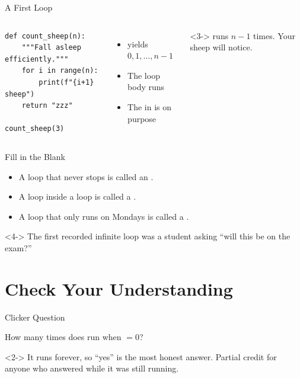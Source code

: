 \documentclass[10pt,aspectratio=169,xcolor=table]{beamer}
\begin{document}
\begin{frame}[fragile]{A First Loop}
  \begin{columns}[T]
      \begin{lstlisting}[style=numbered]
def count_sheep(n):
    """Fall asleep efficiently."""
    for i in range(n):
        print(f"{i+1} sheep")
    return "zzz"

count_sheep(3)
\end{lstlisting}
      \begin{itemize}
        \item<1->  yields $0, 1, \dots, n-1$
        \item<2-> The loop body runs 
        \item<3-> The  in  is
                   on purpose
      \end{itemize}
      \medskip
      \begin{pitfall}<3->
         runs $n-1$ times. Your sheep will notice.
      \end{pitfall}
  \end{columns}
\end{frame}

\begin{frame}{Fill in the Blank}
  \begin{itemize}
    \item A loop that never stops is called an .
    \item A loop inside a loop is called a .
    \item A loop that only runs on Mondays is called a .
  \end{itemize}
  \bigskip
  \begin{funfact}<4->
    The first recorded infinite loop was a student asking
    ``will this be on the exam?''
  \end{funfact}
\end{frame}

\section{Check Your Understanding}

\begin{frame}{Clicker Question}
  \begin{quiz}
    How many times does  run when  $= 0$?
    \begin{choices}
    \end{choices}
  \end{quiz}
  \begin{answer}<2->
    It runs forever, so ``yes'' is the most honest answer.
    Partial credit for anyone who answered while it was still running.
  \end{answer}
\end{frame}
\end{document}

